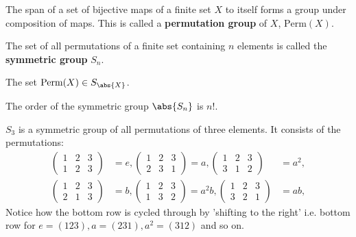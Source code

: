 \documentclass[12pt, a4paper]{article}
\begin{document}
\begin{theorem}
    The span of a set of bijective maps of a finite set \(X\) to itself forms a group under composition of maps. This is called a \textbf{permutation group} of \(X\), \(\text{Perm}(X)\).
\end{theorem}

\begin{definition}
    The set of all permutations of a finite set containing \(n\) elements is called the \textbf{symmetric group} \(S_n\).
\end{definition}

\begin{mdnote}
    The set \(\text{Perm}(X) \in S_{\abs{X}}\).
\end{mdnote}

\begin{theorem}
The order of the symmetric group \(\abs{S_n}\) is \(n!\).
\end{theorem}

\begin{mdexample}
    \(S_3\) is a symmetric group of all permutations of three elements. It consists of the permutations: 
    \[\begin{aligned}
        \begin{pmatrix} 1 & 2& 3 \\ 1 & 2& 3 \end{pmatrix} &=e, 
        \begin{pmatrix} 1 & 2& 3 \\ 2 & 3 & 1 \end{pmatrix} =a,
        \begin{pmatrix} 1 & 2& 3 \\ 3 & 1& 2 \end{pmatrix} &= a^2, \\
        \begin{pmatrix} 1 & 2& 3 \\ 2 & 1& 3 \end{pmatrix} &=b, 
        \begin{pmatrix} 1 & 2& 3 \\ 1 & 3& 2 \end{pmatrix} =a^2b,
        \begin{pmatrix} 1 & 2& 3 \\ 3 & 2& 1 \end{pmatrix}&=ab,
    \end{aligned}\]
    Notice how the bottom row is cycled through by 'shifting to the right' i.e. bottom row for \(e = (123) , a = (231), a^2 = (312)\) and so on.
\end{mdexample}
\end{document}
